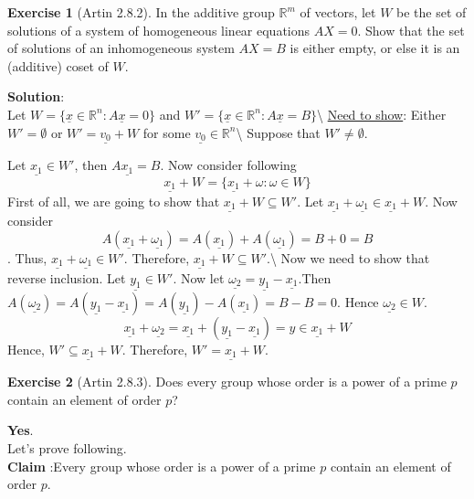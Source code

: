 \documentclass[
]{book}
\theoremstyle{definition}
\theoremstyle{definition}
\theoremstyle{definition}
\newtheorem{exercise}{Exercise}[chapter]
\theoremstyle{definition}
\theoremstyle{remark}
\begin{document}
\begin{exercise}[Artin 2.8.2]
\protect\hypertarget{exr:unnamed-chunk-186}{}\label{exr:unnamed-chunk-186}In the additive group \(\mathbb{R}^m\) of vectors, let \(W\) be the set of solutions of a system of homogeneous linear equations \(AX = 0\). Show that the set of solutions of an inhomogeneous system \(AX = B\) is either empty, or else it is an (additive) coset of \(W\).
\end{exercise}

\textbf{Solution}:\\
Let \(W=\{\underline{x}\in\mathbb{R}^n:A\underline{x}=0\}\)
and \(W'=\{\underline{x}\in\mathbb{R}^n:A\underline{x}=B\}\)\textbackslash{}
\underline{Need to show}: Either \(W'=\emptyset\) or \(W'=\underline{v_0} +W\) for some \(\underline{v_0}\in \mathbb{R}^n\)\textbackslash{}
Suppose that \(W'\neq \emptyset\).

Let \(\underline{x_1}\in W'\), then \(A\underline{x_1}=B\).
Now consider following \[\underline{x_1}+W=\{\underline{x_1}+\omega:\omega\in W\}\]
First of all, we are going to show that \(\underline{x_1}+W \subseteq W'\).
Let \(\underline{x_1}+\underline{\omega_1}\in \underline{x_1}+W\). Now consider
\[A(\underline{x_1}+\underline{\omega_1})=A(\underline{x_1})+A(\underline{\omega_1})=B+0=B\].
Thus, \(\underline{x_1}+\underline{\omega_1}\in W'\). Therefore, \(\underline{x_1}+W\subseteq W'\).\textbackslash{}
Now we need to show that reverse inclusion.
Let \(\underline{y_1}\in W'\). Now let \(\underline{\omega_2}=\underline{y_1}-\underline{x_1}\).Then
\(A(\underline{\omega_2})=A(\underline{y_1}-\underline{x_1})=A(\underline{y_1})-A(\underline{x_1})=B-B=0\). Hence \(\underline{\omega_2}\in W\).
\[ \underline{x_1}+\underline{\omega_2}=\underline{x_1}+(\underline{y_1}-\underline{x_1}) =y \in  \underline{x_1}+W \]
Hence, \(W'\subseteq \underline{x_1}+W\). Therefore, \(W'=\underline{x_1}+W\).

\begin{exercise}[Artin 2.8.3]
\protect\hypertarget{exr:unnamed-chunk-187}{}\label{exr:unnamed-chunk-187}Does every group whose order is a power of a prime \(p\) contain an element of order \(p\)?
\end{exercise}

\textbf{Yes}.\\
Let's prove following.\\
\textbf{Claim} :Every group whose order is a power of a prime \(p\) contain an element of order \(p\).
\end{document}
